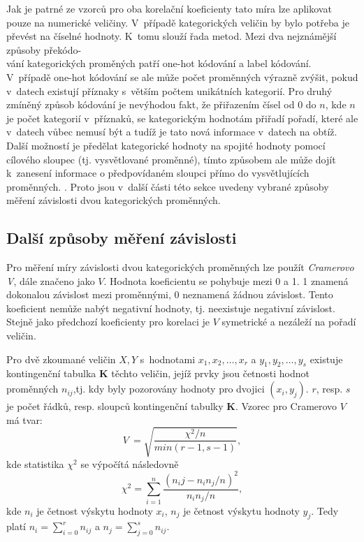 Jak je patrné ze vzorců pro oba korelační koeficienty tato míra lze aplikovat pouze na numerické veličiny. V~případě kategorických veličin by bylo potřeba je převést na číselné hodnoty. K~tomu slouží řada metod. Mezi dva nejznámější způsoby překódo-\\vání kategorických proměných patří one-hot kódování a label kódování. V~případě one-hot kódování se ale může počet proměnných výrazně zvýšit, pokud v~datech existují příznaky s~větším počtem unikátních kategorií. Pro druhý zmíněný způsob kódování je nevýhodou fakt, že přiřazením čísel od 0 do $n$, kde $n$ je počet kategorií v~příznaků, se kategorickým hodnotám přiřadí pořadí, které ale v~datech vůbec nemusí být a tudíž je tato nová informace v~datech na obtíž. Další možností je předělat kategorické hodnoty na spojité hodnoty pomocí cílového sloupec (tj. vysvětlované proměnné), tímto způsobem ale může dojít k~zanesení informace o předpovídaném sloupci přímo do vysvětlujících proměnných. \cite{bib:encoding}. Proto jsou v~další části této sekce uvedeny vybrané způsoby měření závislosti dvou kategorických proměnných.

\subsection{Další způsoby měření závislosti}

Pro měření míry závislosti dvou kategorických proměnných lze použít \emph{Cramerovo V}, dále značeno jako $V$. 
Hodnota koeficientu se pohybuje mezi 0 a 1. 1 znamená dokonalou závislost mezi proměnnými, 0 neznamená žádnou závislost. Tento koeficient nemůže nabýt negativní hodnoty, tj. neexistuje negativní závislost. Stejně jako předchozí koeficienty pro korelaci je $V$ symetrické a nezáleží na pořadí veličin.\cite{bib:correl,bib:MB}

Pro dvě zkoumané veličin $X, Y$ s~hodnotami $x_1, x_2, \ldots, x_r$ a $y_1, y_2, \ldots, y_s$ existuje kontingenční tabulka $\mathbf{K}$ těchto veličin, jejíž prvky jsou četnosti hodnot proměnných $n_{ij}$,tj. kdy byly pozorovány hodnoty pro dvojici $(x_i, y_j)$. $r$, resp. $s$ je počet řádků, resp. sloupců kontingenční tabulky $\mathbf{K}$.
Vzorec pro Cramerovo $V$ má tvar:
\begin{equation}
    V~= \sqrt{\frac{\chi^2 / n}{min(r-1, s-1)}},
\end{equation}
kde statistika $\chi^2$ se výpočítá následovně
\begin{equation}
    \chi^2 = \sum_{i=1}^n \frac{(n_ij - n_in_j/n)^2}{n_in_j/n},
\end{equation}
kde $n_i$ je četnost výskytu hodnoty $x_i$, $n_j$ je četnost výskytu hodnoty $y_j$. Tedy platí $n_i=\sum_{i=0}^r{n_{ij}}$ a $n_j=\sum_{j=0}^s{n_{ij}}$.\cite{bib:statology,bib:correl,bib:MB}

